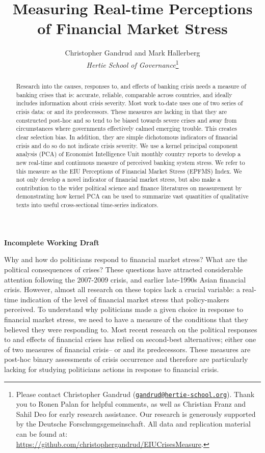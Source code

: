 \documentclass[]{article}
\title{Measuring Real-time Perceptions of Financial Market Stress}
\author{Christopher Gandrud and Mark Hallerberg \\ \emph{Hertie School of Governance}\footnote{Please contact Christopher Gandrud
(\href{mailto:gandrud@hertie-school.org}{\nolinkurl{gandrud@hertie-school.org}}).
Thank you to Ronen Palan for helpful comments, as well as Christian Franz and Sahil Deo for early research assistance. Our research is generously supported by the Deutsche Forschungsgemeinschaft. All data and replication material can be found at:
\url{https://github.com/christophergandrud/EIUCrisesMeasure}.}}
\begin{document}
\maketitle


\textbf{Incomplete Working Draft}

\begin{abstract}
Research into the causes, responses to, and effects of banking crisis needs a measure of banking crises that is: accurate, reliable, comparable across countries, and ideally includes information about crisis severity. Most work to-date uses one of two series of crisis data: \cite{Reinhart2009,ReinhartRog2010} or \cite{laeven2013} and its predecessors. These measures are lacking in that they are constructed post-hoc and so tend to be biased towards severe crises and away from circumstances where governments effectively calmed emerging trouble. This creates clear selection bias. In addition, they are simple dichotomous indicators of financial crisis and do so do not indicate crisis severity. We use a kernel principal component analysis (PCA) of Economist Intelligence Unit monthly country reports to develop a new real-time and continuous measure of perceived banking system stress. We refer to this measure as the EIU Perceptions of Financial Market Stress (EPFMS) Index. We not only develop a novel indicator of financial market stress, but also make a contribution to the wider political science and finance literatures on measurement by demonstrating how kernel PCA can be used to summarize vast quantities of qualitative texts into useful cross-sectional time-series indicators.
\end{abstract}

Why and how do politicians respond to financial market stress? What are the political consequences of crises? These questions have attracted considerable attention following the
2007-2009 crisis, and earlier late-1990s Asian financial crisis. However, almost all research on these topics lack a crucial variable: a real-time indication of the level of financial
market stress that policy-makers perceived. To understand why politicians made a given choice in response to financial market stress, we need to have a measure of the conditions that they believed they were responding to. Most recent research on the political responses to and effects of financial crises has relied on second-best alternatives; either one of two measures of financial crisis--\cite{Reinhart2009,ReinhartRog2010} or \cite{laeven2013} and its predecessors. These measures are post-hoc binary assessments of crisis occurrence and therefore are particularly lacking for studying politicians actions in response to financial crisis.
\end{document}
